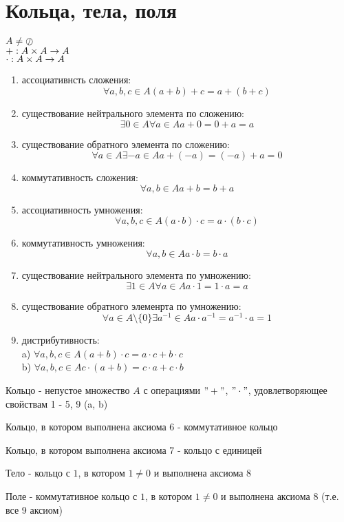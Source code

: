 \section{Кольца, тела, поля}
$A \neq \oslash$\\
$+: A \times A \rightarrow A$\\
$\cdot: A \times A \rightarrow A$\\

\begin{enumerate}
\item ассоциативнсть сложения:
	 $$ \forall a, b, c \in A (a + b) + c = a + (b + c) $$
\item существование нейтрального элемента по сложению:
	$$ \exists 0 \in A \forall a \in A a + 0 = 0 + a = a $$
\item существование обратного элемента по сложению:
	$$ \forall a \in A \exists -a \in A a + (-a) = (-a) + a = 0 $$
\item коммутативность сложения:
	$$ \forall a, b \in A a + b = b + a $$
\item ассоциативность умножения:
	$$ \forall a, b, c \in A (a \cdot b) \cdot c = a \cdot (b \cdot c) $$
\item коммутативность умножения:
	$$ \forall a, b \in A a \cdot b = b \cdot a $$
\item существование нейтрального элемента по умножению:
	$$ \exists 1 \in A \forall a \in A a \cdot 1 = 1 \cdot a = a $$
\item существование обратного элеменрта по умножению:
 	$$ \forall a \in A \setminus \lbrace 0 \rbrace \exists a^{-1} \in A a \cdot a^{-1} = a^{-1} \cdot a = 1 $$
\item дистрибутивность: \\
	a) $ \forall a, b, c \in A (a + b) \cdot c = a \cdot c + b \cdot c $\\
	b) $ \forall a, b, c \in A c \cdot (a + b) = c \cdot a + c \cdot b $\\
\end{enumerate}

\begin{Def}
	Кольцо - непустое множество $A$ с операциями $"+"$, $"\cdot"$, удовлетворяющее свойствам 1 - 5, 9 (a, b)
\end{Def}
\begin{Def}
	Кольцо, в котором выполнена аксиома 6 - коммутативное кольцо
\end{Def}
\begin{Def}
	Кольцо, в котором выполнена аксиома 7 - кольцо с единицей
\end{Def}
\begin{Def}
	Тело - кольцо с $1$, в котором $1 \neq 0$ и выполнена аксиома 8
\end{Def}
\begin{Def}
	Поле - коммутативное кольцо с $1$, в котором $1 \neq 0$ и выполнена аксиома 8 (т.е. все 9 аксиом)
\end{Def}

